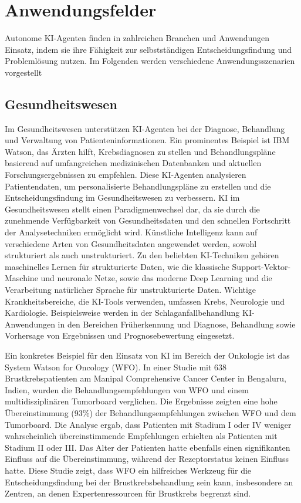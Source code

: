 \documentclass[conference]{IEEEtran}
\begin{document}
\section{Anwendungsfelder}

Autonome KI-Agenten finden in zahlreichen Branchen und Anwendungen Einsatz, indem sie ihre Fähigkeit zur selbstständigen Entscheidungsfindung und Problemlösung nutzen. Im Folgenden werden verschiedene Anwendungsszenarien vorgestellt

\subsection{Gesundheitswesen}

Im Gesundheitswesen unterstützen KI-Agenten bei der Diagnose, Behandlung und Verwaltung von Patienteninformationen. Ein prominentes Beispiel ist IBM Watson, das Ärzten hilft, Krebsdiagnosen zu stellen und Behandlungspläne basierend auf umfangreichen medizinischen Datenbanken und aktuellen Forschungsergebnissen zu empfehlen\cite{somashekhar_watson_2018}. Diese KI-Agenten analysieren Patientendaten, um personalisierte Behandlungspläne zu erstellen und die Entscheidungsfindung im Gesundheitswesen zu verbessern. KI im Gesundheitswesen stellt einen Paradigmenwechsel dar, da sie durch die zunehmende Verfügbarkeit von Gesundheitsdaten und den schnellen Fortschritt der Analysetechniken ermöglicht wird. Künstliche Intelligenz kann auf verschiedene Arten von Gesundheitsdaten angewendet werden, sowohl strukturiert als auch unstrukturiert. Zu den beliebten KI-Techniken gehören maschinelles Lernen für strukturierte Daten, wie die klassische Support-Vektor-Maschine und neuronale Netze, sowie das moderne Deep Learning und die Verarbeitung natürlicher Sprache für unstrukturierte Daten. Wichtige Krankheitsbereiche, die KI-Tools verwenden, umfassen Krebs, Neurologie und Kardiologie. Beispielsweise werden in der Schlaganfallbehandlung KI-Anwendungen in den Bereichen Früherkennung und Diagnose, Behandlung sowie Vorhersage von Ergebnissen und Prognosebewertung eingesetzt\cite{jiang_artificial_2017}.

Ein konkretes Beispiel für den Einsatz von KI im Bereich der Onkologie ist das System Watson for Oncology (WFO). In einer Studie mit 638 Brustkrebspatienten am Manipal Comprehensive Cancer Center in Bengaluru, Indien, wurden die Behandlungsempfehlungen von WFO und einem multidisziplinären Tumorboard verglichen. Die Ergebnisse zeigten eine hohe Übereinstimmung (93\%) der Behandlungsempfehlungen zwischen WFO und dem Tumorboard. Die Analyse ergab, dass Patienten mit Stadium I oder IV weniger wahrscheinlich übereinstimmende Empfehlungen erhielten als Patienten mit Stadium II oder III. Das Alter der Patienten hatte ebenfalls einen signifikanten Einfluss auf die Übereinstimmung, während der Rezeptorstatus keinen Einfluss hatte. Diese Studie zeigt, dass WFO ein hilfreiches Werkzeug für die Entscheidungsfindung bei der Brustkrebsbehandlung sein kann, insbesondere an Zentren, an denen Expertenressourcen für Brustkrebs begrenzt sind\cite{somashekhar_watson_2018}.
\end{document}
